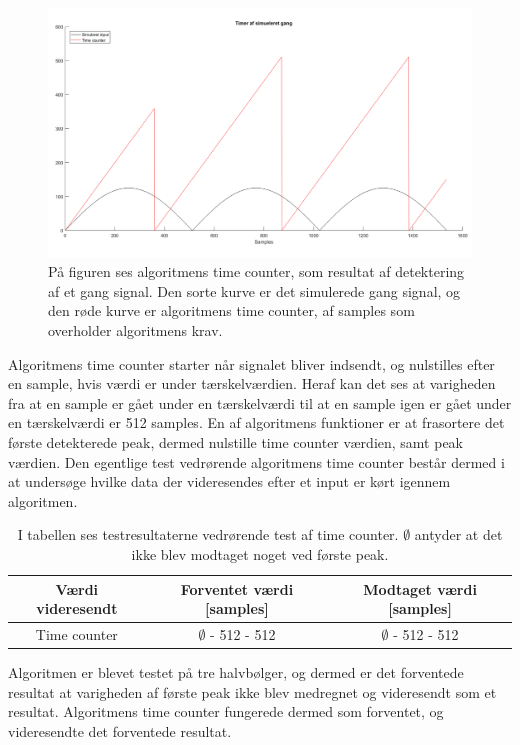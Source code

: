 \begin{figure}[H]
	\centering
	\includegraphics[scale=0.3]{figures/cDesign/test_timecount_gang.png}
	\caption{På figuren ses algoritmens time counter, som resultat af detektering af et gang signal. Den sorte kurve er det simulerede gang signal, og den røde kurve er algoritmens time counter, af samples som overholder algoritmens krav.}
	\label{fig:testgraf_timecounter}
\end{figure}
Algoritmens time counter starter når signalet bliver indsendt, og nulstilles efter en sample, hvis værdi er under tærskelværdien. Heraf kan det ses at varigheden fra at en sample er gået under en tærskelværdi til at en sample igen er gået under en tærskelværdi er 512 samples. En af algoritmens funktioner er at frasortere det første detekterede peak, dermed nulstille time counter værdien, samt peak værdien. Den egentlige test vedrørende algoritmens time counter består dermed i at undersøge hvilke data der videresendes efter et input er kørt igennem algoritmen.

\begin{table}[H]
	\centering
	\begin{tabular}{ccc}
		\hline
		\rowcolor[HTML]{C0C0C0} 
		Værdi videresendt & Forventet værdi [samples] & Modtaget værdi [samples] \\ \hline
		Time counter & $\emptyset$ - 512 - 512 & $\emptyset$ - 512 - 512 \\ \hline
	\end{tabular}
	\caption{I tabellen ses testresultaterne vedrørende test af time counter. $\emptyset$ antyder at det ikke blev modtaget noget ved første peak.}
	\label{tab:test_res_timecount}
\end{table} 
Algoritmen er blevet testet på tre halvbølger, og dermed er det forventede resultat at varigheden af første peak ikke blev medregnet og videresendt som et resultat. Algoritmens time counter fungerede dermed som forventet, og videresendte det forventede resultat. \\

